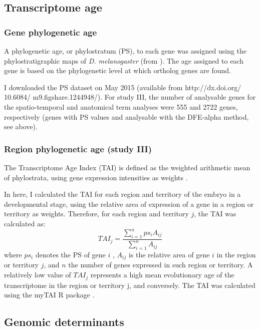 \subsection{Transcriptome age}

\subsubsection{Gene phylogenetic age}
A phylogenetic age, or phylostratum (PS), to each gene was assigned using the phylostratigraphic maps of \textit{D. melanogaster} (from \citealp{Drost2014,Drost2015}). The age assigned to each gene is based on the phylogenetic level at which ortholog genes are found. 

I downloaded the PS dataset on May 2015 (available from http://dx.doi.org/ 10.6084/ m9.figshare.1244948/). For study III, the number of analysable genes for the spatio-temporal and anatomical term analyses were 555 and 2722 genes, respectively (genes with PS values and analysable with the DFE-alpha method, see above).


\subsubsection{Region phylogenetic age (study III)} 

The Transcriptome Age Index (TAI) is defined as the weighted arithmetic mean of phylostrata, using gene expression intensities as weights \citep{Domazet-Loso2010}.

In here, I calculated the TAI for each region and territory of the embryo in a developmental stage, using the relative area of expression of a gene in a region or territory as weights.
Therefore, for each region and territory $j$, the TAI was calculated as:
%
$$ TAI_{j} = \frac{ \sum_{i=1}^{n} ps_{i}A_{ij} }{ \sum_{i=1}^{n} A_{ij} }$$
%
where $ps_{i}$ denotes the PS of gene $i$ , $A_{ij}$ is the relative area of gene $i$ in the region or territory $j$, and $n$ the number of genes expressed in such region or territory. A relatively low value of $TAI_{j}$ represents a high mean evolutionary age of the transcriptome in the region or territory j, and conversely. The TAI was calculated using the myTAI R package \citep{Drost2014}.

\subsection{Genomic determinants}

